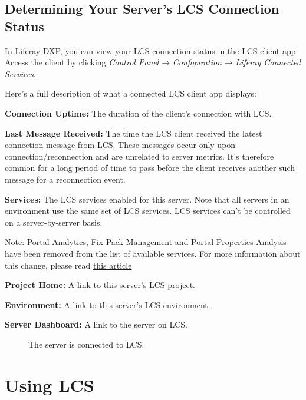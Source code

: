 \noindent\hrulefill

\section{Determining Your Server's LCS Connection
Status}\label{determining-your-servers-lcs-connection-status}

In Liferay DXP, you can view your LCS connection status in the LCS
client app. Access the client by clicking \emph{Control Panel} →
\emph{Configuration} → \emph{Liferay Connected Services}.

Here's a full description of what a connected LCS client app displays:

\textbf{Connection Uptime:} The duration of the client's connection with
LCS.

\textbf{Last Message Received:} The time the LCS client received the
latest connection message from LCS. These messages occur only upon
connection/reconnection and are unrelated to server metrics. It's
therefore common for a long period of time to pass before the client
receives another such message for a reconnection event.

\textbf{Services:} The LCS services enabled for this server. Note that
all servers in an environment use the same set of LCS services. LCS
services can't be controlled on a server-by-server basis.

Note: Portal Analytics, Fix Pack Management and Portal Properties
Analysis have been removed from the list of available services. For more
information about this change, please read
\href{https://help.liferay.com/hc/en-us/articles/360037317691-Liferay-Connected-Services-Feature-Deprecation-Update-March-2020}{this
article}

\textbf{Project Home:} A link to this server's LCS project.

\textbf{Environment:} A link to this server's LCS environment.

\textbf{Server Dashboard:} A link to the server on LCS.

\begin{figure}
\centering
{}
\caption{The server is connected to LCS.}
\end{figure}

\chapter{Using LCS}\label{using-lcs}

